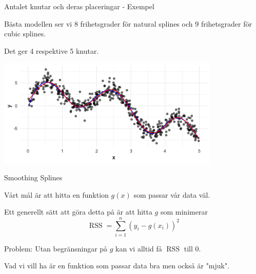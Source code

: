 \documentclass[10pt,english]{beamer}
\begin{document}
\begin{frame}{Antalet knutar och deras placeringar - Exempel}

    Bästa modellen ser vi $8$ frihetsgrader för natural splines och $9$ frihetsgrader för cubic splines.

    Det ger 4 respektive 5 knutar.

    \includegraphics[width=\textwidth]{figs/bestMSE.png}
    

\end{frame}

\begin{frame}{Smoothing Splines}
    
    \begin{greenbox}
        Vårt mål är att hitta en funktion $g(x)$ som passar vår data väl.
    \end{greenbox}

    Ett generellt sätt att göra detta på är att hitta $g$ som minimerar
    \begin{equation*}
        \operatorname{RSS} = \sum_{i=1}^{n}(y_i - g(x_i))^2
    \end{equation*}

    Problem: Utan begränsningar på $g$ kan vi alltid få $\operatorname{RSS}$ till 0.

    Vad vi vill ha är en funktion som passar data bra men också är "mjuk".

\end{frame}
\end{document}

